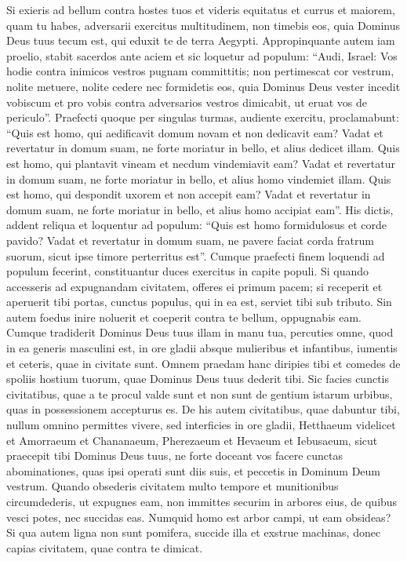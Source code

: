 \begin{biblechapter} 
\verse Si exieris ad bellum contra hostes tuos et videris equitatus et currus et maiorem, quam tu habes, adversarii exercitus multitudinem, non timebis eos, quia Dominus Deus tuus tecum est, qui eduxit te de terra Aegypti. 
\verse Appropinquante autem iam proelio, stabit sacerdos ante aciem et sic loquetur ad populum: 
\verse “Audi, Israel: Vos hodie contra inimicos vestros pugnam committitis; non pertimescat cor vestrum, nolite metuere, nolite cedere nec formidetis eos, 
\verse quia Dominus Deus vester incedit vobiscum et pro vobis contra adversarios vestros dimicabit, ut eruat vos de periculo”. 
\verse Praefecti quoque per singulas turmas, audiente exercitu, proclamabunt: “Quis est homo, qui aedificavit domum novam et non dedicavit eam? Vadat et revertatur in domum suam, ne forte moriatur in bello, et alius dedicet illam. 
\verse Quis est homo, qui plantavit vineam et necdum vindemiavit eam? Vadat et revertatur in domum suam, ne forte moriatur in bello, et alius homo vindemiet illam. 
\verse Quis est homo, qui despondit uxorem et non accepit eam? Vadat et revertatur in domum suam, ne forte moriatur in bello, et alius homo accipiat eam”. 
\verse His dictis, addent reliqua et loquentur ad populum: “Quis est homo formidulosus et corde pavido? Vadat et revertatur in domum suam, ne pavere faciat corda fratrum suorum, sicut ipse timore perterritus est”. 
\verse Cumque praefecti finem loquendi ad populum fecerint, constituantur duces exercitus in capite populi. 
\verse Si quando accesseris ad expugnandam civitatem, offeres ei primum pacem;  
\verse si receperit et aperuerit tibi portas, cunctus populus, qui in ea est, serviet tibi sub tributo. 
\verse Sin autem foedus inire noluerit et coeperit contra te bellum, oppugnabis eam. 
\verse Cumque tradiderit Dominus Deus tuus illam in manu tua, percuties omne, quod in ea generis masculini est, in ore gladii 
\verse absque mulieribus et infantibus, iumentis et ceteris, quae in civitate sunt. Omnem praedam hanc diripies tibi et comedes de spoliis hostium tuorum, quae Dominus Deus tuus dederit tibi. 
\verse Sic facies cunctis civitatibus, quae a te procul valde sunt et non sunt de gentium istarum urbibus, quas in possessionem accepturus es. 
\verse De his autem civitatibus, quae dabuntur tibi, nullum omnino permittes vivere, 
\verse sed interficies in ore gladii, Hetthaeum videlicet et Amorraeum et Chananaeum, Pherezaeum et Hevaeum et Iebusaeum, sicut praecepit tibi Dominus Deus tuus,  
\verse ne forte doceant vos facere cunctas abominationes, quas ipsi operati sunt diis suis, et peccetis in Dominum Deum vestrum. 
\verse Quando obsederis civitatem multo tempore et munitionibus circumdederis, ut expugnes eam, non immittes securim in arbores eius, de quibus vesci potes, nec succidas eas. Numquid homo est arbor campi, ut eam obsideas? 
\verse Si qua autem ligna non sunt pomifera, succide illa et exstrue machinas, donec capias civitatem, quae contra te dimicat. 
\end{biblechapter}

